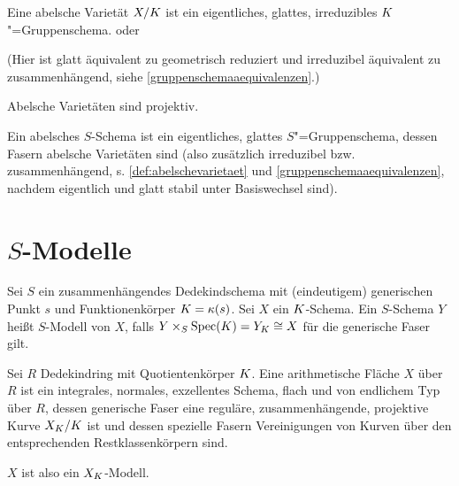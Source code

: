 \documentclass[german]{scrreprt}
\begin{document}
\begin{Definition}\label{def:abelschevarietaet}
Eine abelsche Varietät $X/K$ ist ein eigentliches, glattes,
irreduzibles $K$"=Gruppenschema.
\cite[9.6, Definition 1]{bosch} oder \cite[Definition 16.52]{wedhorn}

(Hier ist glatt äquivalent zu geometrisch reduziert und irreduzibel
äquivalent zu zusammenhängend, 
siehe \ref{gruppenschemaaequivalenzen}.)

\begin{Bemerkung}\label{thm:abvarietaetprojektiv}
Abelsche Varietäten sind projektiv.
\cite[9.6, Proposition 4]{bosch}
\end{Bemerkung}
\end{Definition}

\begin{Definition}
Ein abelsches $S$-Schema ist ein eigentliches, glattes $S$"=Gruppenschema,
dessen Fasern abelsche Varietäten sind 
(also zusätzlich irreduzibel bzw. zusammenhängend,
s. \ref{def:abelschevarietaet} und \ref{gruppenschemaaequivalenzen},
nachdem eigentlich und glatt stabil unter Basiswechsel sind).
\end{Definition}


\chapter{$S$-Modelle}
\begin{Definition}[$S$-Modell]
  Sei $S$ ein zusammenhängendes Dedekindschema mit (eindeutigem)
  generischen Punkt $s$ und Funktionenkörper $K=\kappa(s)$.
  Sei $X$ ein $K$-Schema.
  Ein $S$-Schema $Y$ heißt $S$-Modell von $X$, falls
  $Y\times_S\operatorname{Spec}(K)=Y_K\cong X$ für die generische Faser gilt.
\end{Definition}

\begin{Definition}
  Sei $R$ Dedekindring mit Quotientenkörper $K$.
  Eine arithmetische Fläche $X$ über $R$ ist ein
  integrales, normales, exzellentes Schema, flach und von endlichem
  Typ über $R$,
  dessen generische Faser eine reguläre, zusammenhängende,
  projektive Kurve $X_{K}/K$ ist
  und dessen spezielle Fasern Vereinigungen von Kurven über den
  entsprechenden Restklassenkörpern sind.
  \cite[IV.4]{silverman2}
  
  $X$ ist also ein $X_{K}$-Modell.
\end{Definition}
\end{document}
